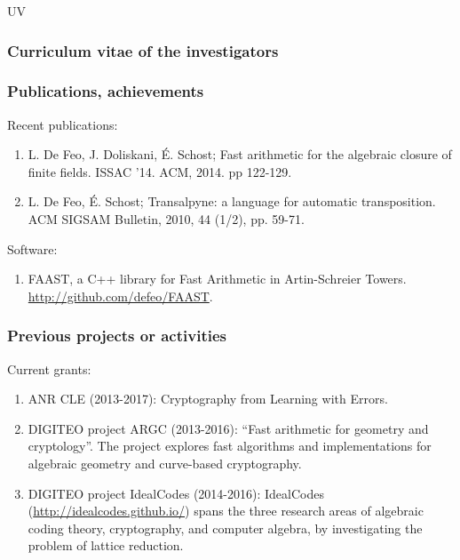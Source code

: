 \begin{sitedescription}{UV}
\subsubsection*{Curriculum vitae of the investigators}


%

\subsubsection*{Publications, achievements}

Recent publications:

\begin{enumerate}
\item L. De Feo, J. Doliskani, É. Schost; Fast arithmetic for the
  algebraic closure of finite fields. ISSAC '14. ACM, 2014. pp
  122-129.
\item L. De Feo, É. Schost; Transalpyne: a language for automatic
  transposition. ACM SIGSAM Bulletin, 2010, 44 (1/2), pp. 59-71.
\end{enumerate}

Software:

\begin{enumerate}
\item FAAST, a C++ library for Fast Arithmetic in Artin-Schreier
  Towers. \url{http://github.com/defeo/FAAST}.
\end{enumerate}

\subsubsection*{Previous projects or activities}

Current grants:

\begin{enumerate}
\item ANR CLE (2013-2017): Cryptography from Learning with Errors.
\item DIGITEO project ARGC (2013-2016): ``Fast arithmetic for geometry
  and cryptology''. The project explores fast algorithms and
  implementations for algebraic geometry and curve-based cryptography.
\item DIGITEO project IdealCodes (2014-2016): IdealCodes
  (\url{http://idealcodes.github.io/}) spans the three research areas
  of algebraic coding theory, cryptography, and computer algebra, by
  investigating the problem of lattice reduction.
\end{enumerate}
\end{sitedescription}

